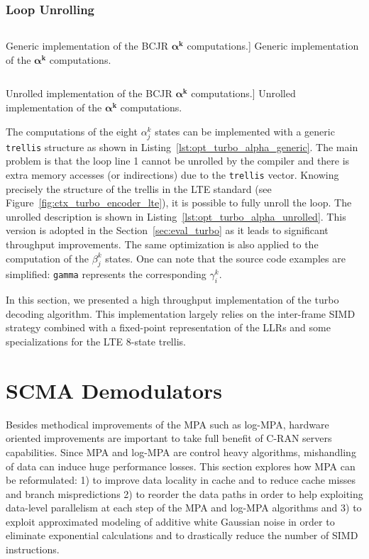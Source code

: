 \subsubsection{Loop Unrolling}

\begin{listing}[htp]
  \inputminted[frame=lines,linenos]{C++}{\curChapter/src/turbo/alpha_generic.cpp}
  \caption
    [Generic implementation of the BCJR $\bm{\alpha^k}$ computations.]
    {Generic implementation of the $\bm{\alpha^k}$ computations.}
  \label{lst:opt_turbo_alpha_generic}
\end{listing}

\begin{listing}[htp]
  \inputminted[frame=lines,linenos]{C++}{\curChapter/src/turbo/alpha_unrolled.cpp}
  \caption
    [Unrolled implementation of the BCJR $\bm{\alpha^k}$ computations.]
    {Unrolled implementation of the $\bm{\alpha^k}$ computations.}
  \label{lst:opt_turbo_alpha_unrolled}
\end{listing}

The computations of the eight $\alpha^k_j$ states can be implemented with
a generic \verb|trellis| structure as shown in
Listing~\ref{lst:opt_turbo_alpha_generic}. The main problem is that the loop
line 1 cannot be unrolled by the compiler and there is extra memory accesses (or
indirections) due to the \verb|trellis| vector. Knowing precisely the structure
of the trellis in the LTE standard (see Figure~\ref{fig:ctx_turbo_encoder_lte}),
it is possible to fully unroll the loop. The unrolled description is shown in
Listing~\ref{lst:opt_turbo_alpha_unrolled}. This version is adopted in
the Section~\ref{sec:eval_turbo} as it leads to significant throughput
improvements. The same optimization is also applied to the computation of the
$\beta^k_j$ states. One can note that the source code examples are simplified:
\verb|gamma| represents the corresponding $\gamma^k_i$.

In this section, we presented a high throughput implementation of the turbo
decoding algorithm. This implementation largely relies on the inter-frame SIMD
strategy combined with a fixed-point representation of the LLRs and some
specializations for the LTE 8-state trellis.

\section{SCMA Demodulators}
\label{sec:opt_scma}

Besides methodical improvements of the MPA such as log-MPA, hardware oriented
improvements are important to take full benefit of C-RAN servers
capabilities. Since MPA and log-MPA are control heavy algorithms, mishandling of
data can induce huge performance losses. This section explores how MPA can be
reformulated: 1) to improve data locality in cache and to reduce cache misses
and branch mispredictions 2) to reorder the data paths in order to help
exploiting data-level parallelism at each step of the MPA and log-MPA algorithms
and 3) to exploit approximated modeling of additive white Gaussian noise in
order to eliminate exponential calculations and to drastically reduce the number
of SIMD instructions.

